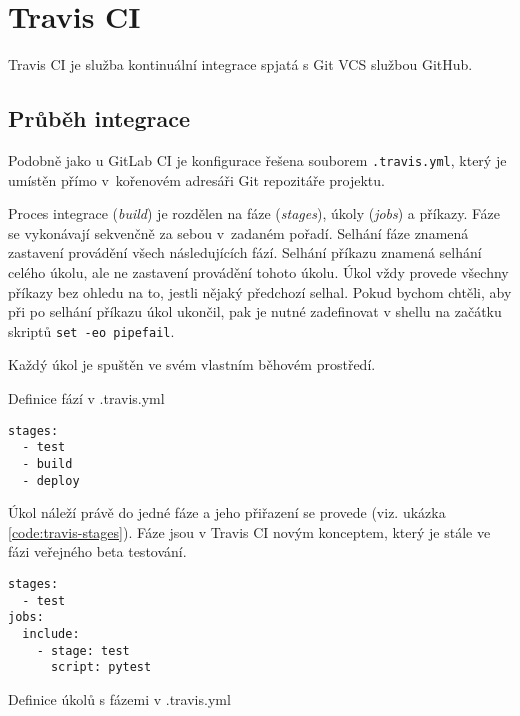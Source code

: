 \section{Travis CI}

Travis CI je služba kontinuální integrace spjatá s Git VCS službou GitHub.

\subsection{Průběh integrace}

Podobně jako u GitLab CI je konfigurace řešena souborem \verb|.travis.yml|, který je umístěn přímo v~kořenovém adresáři Git repozitáře projektu.

Proces integrace (\textit{build}) je rozdělen na fáze (\textit{stages}), úkoly (\textit{jobs}) a příkazy.
Fáze se vykonávají sekvenčně za sebou v~zadaném pořadí.
Selhání fáze znamená zastavení provádění všech následujících fází.
Selhání příkazu znamená selhání celého úkolu, ale ne zastavení provádění tohoto úkolu.
Úkol vždy provede všechny příkazy bez ohledu na to, jestli nějaký předchozí selhal. 
Pokud bychom chtěli, aby při po selhání příkazu úkol ukončil, pak je nutné zadefinovat v shellu na začátku skriptů \verb|set -eo pipefail|.

Každý úkol je spuštěn ve svém vlastním běhovém prostředí.

\begin{listing}[ht]
\caption{\label{code:travis-stages}Definice fází v .travis.yml}
\begin{verbatim}
stages:
  - test
  - build
  - deploy
\end{verbatim}
\end{listing}

Úkol náleží právě do jedné fáze a jeho přiřazení se provede (viz. ukázka \ref{code:travis-stages}).
Fáze jsou v Travis CI novým konceptem, který je stále ve fázi veřejného beta testování.

\begin{listing}[ht]
\begin{verbatim}
stages:
  - test
jobs:
  include:
    - stage: test
      script: pytest

\end{verbatim}
\label{code:travis-stages}
\caption{Definice úkolů s fázemi v .travis.yml}
\end{listing}

